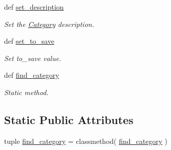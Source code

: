 \begin{CompactItemize}
def \hyperlink{classwinsollib_1_1Category_c1ebe25d537e9c7c9482e397dbf4deed}{set\_\-description}
\begin{CompactList}\small\item\em Set the \hyperlink{classwinsollib_1_1Category}{Category} description. \item\end{CompactList}\item 
def \hyperlink{classwinsollib_1_1Category_c70bd81d5ae3a58e3174a6d2cfeca496}{set\_\-to\_\-save}
\begin{CompactList}\small\item\em Set {\em to\_\-save\/} value. \item\end{CompactList}\item 
def \hyperlink{classwinsollib_1_1Category_6cd15f5bc301cd636af3a59b813f57cb}{find\_\-category}
\begin{CompactList}\small\item\em Static method. \item\end{CompactList}\end{CompactItemize}
\subsection*{Static Public Attributes}
\begin{CompactItemize}
\item 
tuple \hyperlink{classwinsollib_1_1Category_ced2fd769fd79d564f6b5fc588797d2d}{find\_\-category} = classmethod( \hyperlink{classwinsollib_1_1Category_ced2fd769fd79d564f6b5fc588797d2d}{find\_\-category} )
\end{CompactItemize}
